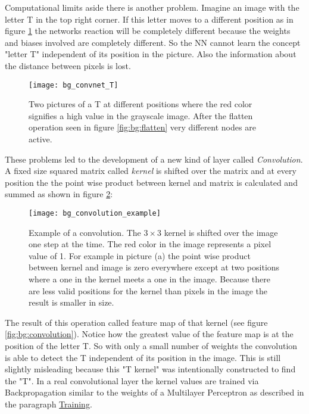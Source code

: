 Computational limits aside there is another problem. Imagine an image with the letter T in the top right corner. If this letter moves to a different position as in figure \ref{fig:bg:convnet_T} the networks reaction will be completely different because the weights and biases involved are completely different. So the NN cannot learn the concept "letter T" independent of its position in the picture. Also the information about the distance between pixels is lost.

\begin{figure}[H]
    \centering
    \texttt{[image: bg\_convnet\_T]}
    \caption{Two pictures of a T at different positions where the red color signifies a high value in the grayscale image. After the flatten operation seen in figure \ref{fig:bg:flatten} very different nodes are active.}
    \label{fig:bg:convnet_T}
\end{figure}

These problems led to the development of a new kind of layer called \textit{Convolution}. A fixed size squared matrix called \textit{kernel} is shifted over the matrix and at every position the the point wise product between kernel and matrix is calculated and summed as shown in figure \ref{fig:bg:conv_examp}:

\begin{figure}[H]
    \centering
    \texttt{[image: bg\_convolution\_example]}
    \caption{Example of a convolution. The $3 \times 3$ kernel is shifted over the image one step at the time. The red color in the image represents a pixel value of 1. For example in picture (a) the point wise product between kernel and image is zero everywhere except at two positions where a one in the kernel meets a one in the image. Because there are less valid positions for the kernel than pixels in the image the result is smaller in size.}
    \label{fig:bg:conv_examp}
\end{figure}


 The result of this operation called feature map of that kernel (see figure \ref{fig:bg:convolution}). Notice how the greatest value of the feature map is at the position of the letter T. So with only a small number of weights the convolution is able to detect the T independent of its position in the image.
 This is still slightly misleading because this "T kernel" was intentionally constructed to find the "T". In a real convolutional layer the kernel values are trained via Backpropagation similar to the weights of a Multilayer Perceptron as described in the paragraph \hyperref[par:training]{Training}.

